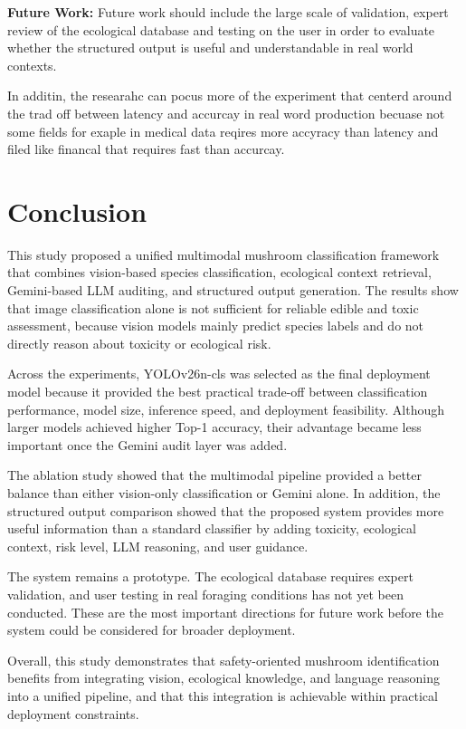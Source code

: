 \documentclass[journal,transmag]{IEEEtran}
\begin{document}
\textbf{Future Work:} Future work should include the large scale of validation, expert review of the ecological database and testing on the user in order to evaluate whether the structured output is useful and understandable in real world contexts.

In additin, the researahc can pocus more of the experiment that centerd around the trad off between latency and accurcay in real word production becuase not some fields for exaple in medical data reqires more accyracy than latency and filed like financal that requires fast than accurcay. 




\section{\textbf{Conclusion}}

This study proposed a unified multimodal mushroom classification framework that combines vision-based species classification, ecological context retrieval, Gemini-based LLM auditing, and structured output generation. The results show that image classification alone is not sufficient for reliable edible and toxic assessment, because vision models mainly predict species labels and do not directly reason about toxicity or ecological risk.

Across the experiments, YOLOv26n-cls was selected as the final deployment model because it provided the best practical trade-off between classification performance, model size, inference speed, and deployment feasibility. Although larger models achieved higher Top-1 accuracy, their advantage became less important once the Gemini audit layer was added.

The ablation study showed that the multimodal pipeline provided a better balance than either vision-only classification or Gemini alone. In addition, the structured output comparison showed that the proposed system provides more useful information than a standard classifier by adding toxicity, ecological context, risk level, LLM reasoning, and user guidance.

The system remains a prototype. The ecological database requires expert validation, and user testing in real foraging conditions has not yet been conducted. These are the most important directions for future work before the system could be considered for broader deployment.

Overall, this study demonstrates that safety-oriented mushroom identification benefits from integrating vision, ecological knowledge, and language reasoning into a unified pipeline, and that this integration is achievable within practical deployment constraints.
\end{document}
